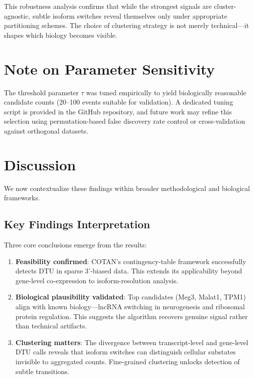 This robustness analysis confirms that while the strongest signals are cluster-agnostic, subtle isoform switches reveal themselves only under appropriate partitioning schemes. The choice of clustering strategy is not merely technical---it shapes which biology becomes visible.

\section*{Note on Parameter Sensitivity}

The threshold parameter $\tau$ was tuned empirically to yield biologically reasonable candidate counts (20--100 events suitable for validation). A dedicated tuning script is provided in the GitHub repository, and future work may refine this selection using permutation-based false discovery rate control or cross-validation against orthogonal datasets.

\section{Discussion}

We now contextualize these findings within broader methodological and biological frameworks.

\subsection*{Key Findings Interpretation}

Three core conclusions emerge from the results:
\begin{enumerate}
    \item \textbf{Feasibility confirmed}: COTAN's contingency-table framework successfully detects DTU in sparse 3'-biased data. This extends its applicability beyond gene-level co-expression to isoform-resolution analysis.

    \item \textbf{Biological plausibility validated}: Top candidates (Meg3, Malat1, TPM1) align with known biology---lncRNA switching in neurogenesis and ribosomal protein regulation. This suggests the algorithm recovers genuine signal rather than technical artifacts.

    \item \textbf{Clustering matters}: The divergence between transcript-level and gene-level DTU calls reveals that isoform switches can distinguish cellular substates invisible to aggregated counts. Fine-grained clustering unlocks detection of subtle transitions.
\end{enumerate}

